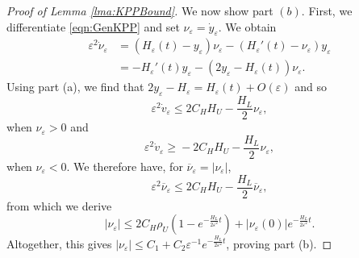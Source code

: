 \documentclass[]{article}
\theoremstyle{remark}
\begin{document}
\begin{proof}[Proof of Lemma \ref{lma:KPPBound}]
We now show part $(b)$. First, we differentiate \eqref{eqn:GenKPP} and set $\nu_\varepsilon=\dot{y}_\varepsilon$.  We obtain 
\begin{align*}
\varepsilon^{2}\dot{\nu}_\varepsilon&=(H_\varepsilon(t)-y_\varepsilon)\nu_\varepsilon-(H_\varepsilon'(t)-\nu_\varepsilon)y_\varepsilon\\
&=-H_\varepsilon'(t)y_\varepsilon-(2y_\varepsilon-H_\varepsilon(t))\nu_\varepsilon.
\end{align*}
Using part (a), we find that $2y_\varepsilon-H_\varepsilon=H_\varepsilon(t)+O(\varepsilon)$ and so
\[\varepsilon^{2}\dot{v}_\varepsilon\leq{}2C_HH_U-\frac{H_L}{2}\nu_\varepsilon,\]
when $\nu_\varepsilon>0$ and
\[\varepsilon^{2}\dot{v}_\varepsilon\geq{}-2C_HH_U-\frac{H_L}{2}\nu_\varepsilon,\]
when $\nu_\varepsilon<0$. We therefore have, for $\overline{\nu}_\varepsilon=|\nu_\varepsilon|$,
\[\varepsilon^2\overline{\nu}_\varepsilon\leq{}2C_HH_U-\frac{H_L}{2}\overline{\nu}_\varepsilon,\]
from which we derive
\[
|\nu_\varepsilon|\leq{}2C_H\rho_U\left(1-e^{-\frac{H_L}{2\varepsilon^2}t}\right)+|\nu_\varepsilon(0)|e^{-\frac{H_L}{2\varepsilon^2}t}.
\]
Altogether, this gives $|\nu_\varepsilon|\leq{}C_1+C_2\varepsilon^{-1}e^{-\frac{H_L}{2\varepsilon^2}t}$, proving part (b). 

\end{proof}
\end{document}
